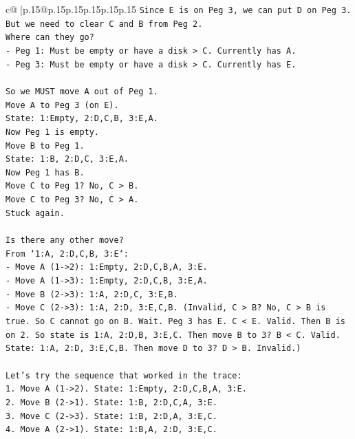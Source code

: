 \documentclass{article}
\begin{document}
{\begin{supertabular}{c@{$\;$}|p{.15\linewidth}@{}p{.15\linewidth}p{.15\linewidth}p{.15\linewidth}p{.15\linewidth}p{.15\linewidth}}
{{{\texttt{Since E is on Peg 3, we can put D on Peg 3.} \\
\texttt{But we need to clear C and B from Peg 2.} \\
\texttt{Where can they go?} \\
\texttt{{-} Peg 1: Must be empty or have a disk > C. Currently has A.} \\
\texttt{{-} Peg 3: Must be empty or have a disk > C. Currently has E.} \\
\\ 
\texttt{So we MUST move A out of Peg 1.} \\
\texttt{Move A to Peg 3 (on E).} \\
\texttt{State: 1:Empty, 2:D,C,B, 3:E,A.} \\
\texttt{Now Peg 1 is empty.} \\
\texttt{Move B to Peg 1.} \\
\texttt{State: 1:B, 2:D,C, 3:E,A.} \\
\texttt{Now Peg 1 has B.} \\
\texttt{Move C to Peg 1? No, C > B.} \\
\texttt{Move C to Peg 3? No, C > A.} \\
\texttt{Stuck again.} \\
\\ 
\texttt{Is there any other move?} \\
\texttt{From `1:A, 2:D,C,B, 3:E`:} \\
\texttt{{-} Move A (1{-}>2): 1:Empty, 2:D,C,B,A, 3:E.} \\
\texttt{{-} Move A (1{-}>3): 1:Empty, 2:D,C,B, 3:E,A.} \\
\texttt{{-} Move B (2{-}>3): 1:A, 2:D,C, 3:E,B.} \\
\texttt{{-} Move C (2{-}>3): 1:A, 2:D, 3:E,C,B. (Invalid, C > B? No, C > B is true. So C cannot go on B. Wait. Peg 3 has E. C < E. Valid. Then B is on 2. So state is 1:A, 2:D,B, 3:E,C. Then move B to 3? B < C. Valid. State: 1:A, 2:D, 3:E,C,B. Then move D to 3? D > B. Invalid.)} \\
\\ 
\texttt{Let's try the sequence that worked in the trace:} \\
\texttt{1. Move A (1{-}>2). State: 1:Empty, 2:D,C,B,A, 3:E.} \\
\texttt{2. Move B (2{-}>1). State: 1:B, 2:D,C,A, 3:E.} \\
\texttt{3. Move C (2{-}>3). State: 1:B, 2:D,A, 3:E,C.} \\
\texttt{4. Move A (2{-}>1). State: 1:B,A, 2:D, 3:E,C.} \\
}}}
\end{supertabular}}
\end{document}
